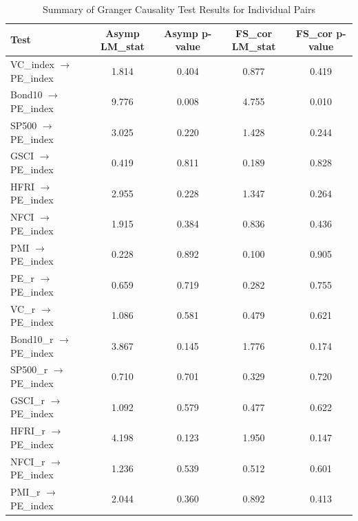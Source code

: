 \documentclass[12pt]{article}
\begin{document}
\begin{table}[H]
\centering
\caption{Summary of Granger Causality Test Results for Individual Pairs}
\label{tab:granger_results_pairs}
\begin{tabular}{|l|c|c|c|c|}
\hline
\textbf{Test} & \textbf{Asymp LM\_stat} & \textbf{Asymp p-value} & \textbf{FS\_cor LM\_stat} & \textbf{FS\_cor p-value} \\ \hline
VC\_index $\rightarrow$ PE\_index & 1.814 & 0.404 & 0.877 & 0.419 \\ \hline
Bond10 $\rightarrow$ PE\_index & 9.776 & 0.008 & 4.755 & 0.010 \\ \hline
SP500 $\rightarrow$ PE\_index & 3.025 & 0.220 & 1.428 & 0.244 \\ \hline
GSCI $\rightarrow$ PE\_index & 0.419 & 0.811 & 0.189 & 0.828 \\ \hline
HFRI $\rightarrow$ PE\_index & 2.955 & 0.228 & 1.347 & 0.264 \\ \hline
NFCI $\rightarrow$ PE\_index & 1.915 & 0.384 & 0.836 & 0.436 \\ \hline
PMI $\rightarrow$ PE\_index & 0.228 & 0.892 & 0.100 & 0.905 \\ \hline
PE\_r $\rightarrow$ PE\_index & 0.659 & 0.719 & 0.282 & 0.755 \\ \hline
VC\_r $\rightarrow$ PE\_index & 1.086 & 0.581 & 0.479 & 0.621 \\ \hline
Bond10\_r $\rightarrow$ PE\_index & 3.867 & 0.145 & 1.776 & 0.174 \\ \hline
SP500\_r $\rightarrow$ PE\_index & 0.710 & 0.701 & 0.329 & 0.720 \\ \hline
GSCI\_r $\rightarrow$ PE\_index & 1.092 & 0.579 & 0.477 & 0.622 \\ \hline
HFRI\_r $\rightarrow$ PE\_index & 4.198 & 0.123 & 1.950 & 0.147 \\ \hline
NFCI\_r $\rightarrow$ PE\_index & 1.236 & 0.539 & 0.512 & 0.601 \\ \hline
PMI\_r $\rightarrow$ PE\_index & 2.044 & 0.360 & 0.892 & 0.413 \\ \hline
\end{tabular}
\end{table}
\end{document}
